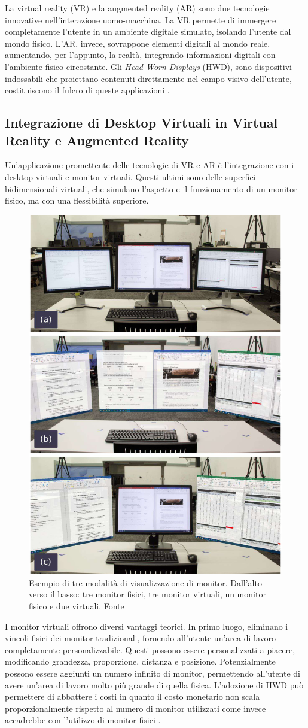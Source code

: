 \documentclass[12pt,a4paper,openright,twoside]{book}
\begin{document}
La virtual reality (VR) e la augmented reality (AR) sono due tecnologie innovative nell'interazione uomo-macchina. La VR permette di immergere completamente l'utente in un ambiente digitale simulato, isolando l'utente dal mondo fisico. L'AR, invece, sovrappone elementi digitali al mondo reale, aumentando, per l'appunto, la realtà, integrando informazioni digitali con l'ambiente fisico circostante. Gli \textit{Head-Worn Displays} (HWD), sono dispositivi indossabili che proiettano contenuti direttamente nel campo visivo dell'utente, costituiscono il fulcro di queste applicazioni \cite{pavanatto2021, frontiers2023}.

\subsection{Integrazione di Desktop Virtuali in Virtual Reality e Augmented Reality}

Un'applicazione promettente delle tecnologie di VR e AR è l'integrazione con i desktop virtuali e monitor virtuali. Questi ultimi sono delle superfici bidimensionali virtuali, che simulano l'aspetto e il funzionamento di un monitor fisico, ma con una flessibilità superiore\cite{pavanatto2021, frontiers2023}.
\begin{figure}
    \centering
    \includegraphics[width=.4\linewidth]{figures/virtual_monitors.jpg}
    \caption[xarch]{Esempio di tre modalità di visualizzazione di monitor. Dall'alto verso il basso: tre monitor fisici, tre monitor virtuali, un monitor fisico e due virtuali. Fonte \cite{pavanatto2021}}
\end{figure}

I monitor virtuali offrono diversi vantaggi teorici. In primo luogo, eliminano i vincoli fisici dei monitor tradizionali, fornendo all'utente un'area di lavoro completamente personalizzabile. Questi possono essere personalizzati a piacere, modificando grandezza, proporzione, distanza e posizione. Potenzialmente possono essere aggiunti un numero infinito di monitor, permettendo all'utente di avere un'area di lavoro molto più grande di quella fisica.
L'adozione di HWD può permettere di abbattere i costi in quanto il costo monetario non scala proporzionalmente rispetto al numero di monitor utilizzati come invece accadrebbe con l'utilizzo di monitor fisici \cite{frontiers2023}.
\end{document}
